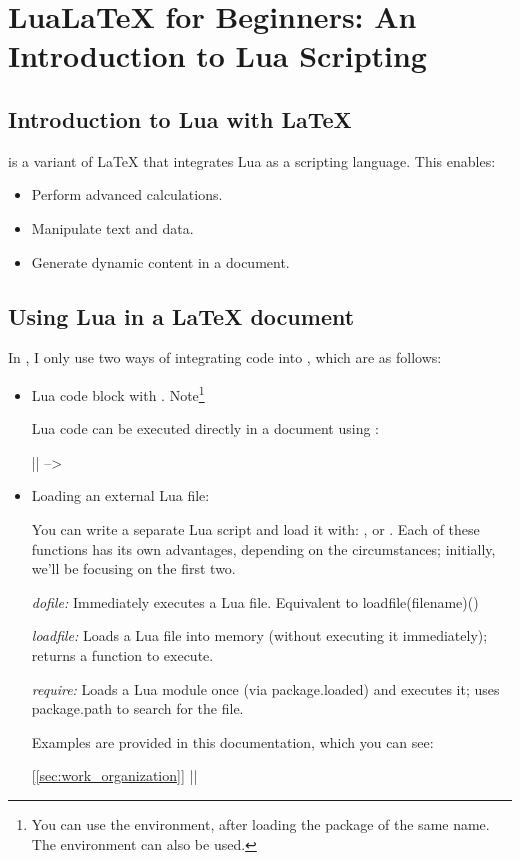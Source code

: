 \newpage
\section{LuaLaTeX for Beginners: An Introduction to Lua Scripting}

\subsection{Introduction to Lua with LaTeX}

\tkzEngine{\LUALATEX} is a variant of LaTeX that integrates Lua as a scripting language. This enables:

\begin{itemize}
  \item Perform advanced calculations.
  \item Manipulate text and data.
  \item Generate dynamic content in a document.
\end{itemize}

\subsection{Using Lua in a LaTeX document}

In , I only use two ways of integrating code into , which are as follows:

\begin{itemize}
  \item  Lua code block with . Note\footnote{You can use the  environment, after loading the package of the same name. The   environment can also be used.}

  Lua code can be executed directly in a document using :

  || -->  

  \item  Loading an external Lua file:

  You can write a separate Lua script  and load it with: ,  or . Each of these functions has its own advantages, depending on the circumstances; initially, we'll be focusing on the first two.

 \emph{dofile:}   Immediately executes a Lua file. Equivalent to loadfile(filename)()

\emph{loadfile:}    Loads a Lua file into memory (without executing it immediately); returns a function to execute.

\emph{require:} Loads a Lua module once (via package.loaded) and executes it; uses package.path to search for the file.


Examples are provided in this documentation, which you can see:

 [\ref{sec:work_organization}] ||


\end{itemize}

